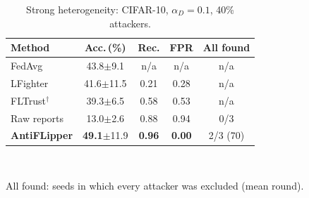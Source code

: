 \begin{table}[t]
\centering
\caption{Strong heterogeneity: CIFAR-10, $\alpha_D{=}0.1$, 40\% attackers.}
\label{tab:skew}
\footnotesize
\setlength{\tabcolsep}{4.5pt}
\begin{tabular}{@{}l cccc@{}}
\toprule
\textbf{Method} & Acc.\,(\%) & Rec. & FPR & All found \\
\midrule
FedAvg & 43.8{\scriptsize$\pm$9.1} & n/a & n/a & n/a \\
LFighter & 41.6{\scriptsize$\pm$11.5} & 0.21 & 0.28 & n/a \\
FLTrust$^{\dagger}$ & 39.3{\scriptsize$\pm$6.5} & 0.58 & 0.53 & n/a \\
\midrule
Raw reports & 13.0{\scriptsize$\pm$2.6} & 0.88 & 0.94 & 0/3 \\
\textbf{AntiFLipper} & \textbf{49.1}{\scriptsize$\pm$11.9} & \textbf{0.96} & \textbf{0.00} & 2/3 (70) \\
\bottomrule
\end{tabular}
\\[2pt]\parbox{\linewidth}{\scriptsize All found: seeds in which every attacker was excluded (mean round).}
\end{table}

